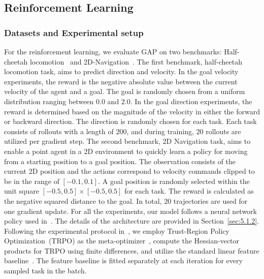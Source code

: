 \subsection{Reinforcement Learning}
\subsubsection{Datasets and Experimental setup}
For the reinforcement learning, we evaluate GAP on two benchmarks: Half-cheetah locomotion~\cite{todorov2012physics} and 2D-Navigation~\cite{finn2017model}. 
The first benchmark, half-cheetah locomotion task, aims to predict direction and velocity. 
In the goal velocity experiments, the reward is the negative absolute value between the current velocity of the agent and a goal. The goal is randomly chosen from a uniform distribution ranging between $0.0$ and $2.0$. 
In the goal direction experiments, the reward is determined based on the magnitude of the velocity in either the forward or backward direction. The direction is randomly chosen for each task. 
Each task consists of rollouts with a length of $200$, and during training, $20$ rollouts are utilized per gradient step. 
The second benchmark, 2D Navigation task, aims to enable a point agent in a 2D environment to quickly learn a policy for moving from a starting position to a goal position. 
The observation consists of the current 2D position and the actions correspond to velocity commands clipped to be in the range of $[-0.1, 0.1]$. 
A goal position is randomly selected within the unit square $[-0.5, 0.5] \times [-0.5, 0.5]$ for each task. 
The reward is calculated as the negative squared distance to the goal. 
In total, $20$ trajectories are used for one gradient update. 
For all the experiments, our model follows a neural network policy used in~\cite{finn2017model}. The details of the architecture are provided in Section~\ref{sec:5.1.2}. 
Following the experimental protocol in~\cite{finn2017model}, we employ Trust-Region Policy Optimization~(TRPO) as the meta-optimizer~\cite{schulman2015trust}, compute the Hessian-vector products for TRPO using finite differences, and utilize the standard linear feature baseline~\cite{duan2016benchmarking}. 
The feature baseline is fitted separately at each iteration for every sampled task in the batch.

